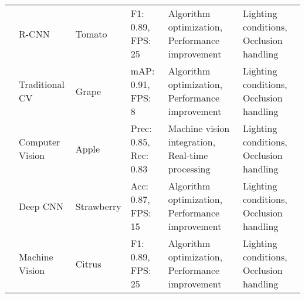 \begin{table*}[htbp]
\begin{tabular}{@{}p{}p{}p{}p{}p{}p{}@{}}
\cite{r2018research} & R-CNN & Tomato & F1: 0.89, FPS: 25 & Algorithm optimization, Performance improvement & Lighting conditions, Occlusion handling \\
\cite{mohamed2021smart} & Traditional CV & Grape & mAP: 0.91, FPS: 8 & Algorithm optimization, Performance improvement & Lighting conditions, Occlusion handling \\
\cite{sharma2020machine} & Computer Vision & Apple & Prec: 0.85, Rec: 0.83 & Machine vision integration, Real-time processing & Lighting conditions, Occlusion handling \\
\cite{zhang2020technology} & Deep CNN & Strawberry & Acc: 0.87, FPS: 15 & Algorithm optimization, Performance improvement & Lighting conditions, Occlusion handling \\
\cite{zhao2013design} & Machine Vision & Citrus & F1: 0.89, FPS: 25 & Algorithm optimization, Performance improvement & Lighting conditions, Occlusion handling \\
\bottomrule
\end{tabular}
\end{table*}